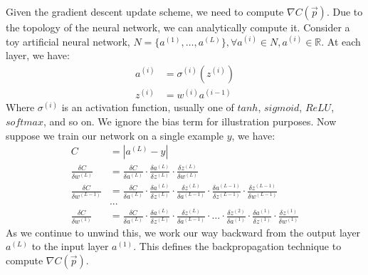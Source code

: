 \documentclass[paper=a4, fontsize=12pt]{scrartcl} %
\numberwithin{equation}{section} %
\numberwithin{figure}{section} %
\numberwithin{table}{section} %
\begin{document}
Given the gradient descent update scheme, we need to compute $\nabla C(\vec{p})$. Due to the topology of the neural network, we can analytically compute it. Consider a toy artificial neural network,
$N = \{a^{(1)}, \ldots, a^{(L)} \}, \forall a^{(i)} \in N, a^{(i)} \in \mathbb{R}$. At each layer, we have:
\begin{align*}
    a^{(i)} &= \sigma^{(i)} (z^{(i)}) \\
    z^{(i)} &= w^{(i)} a^{(i - 1)}
\end{align*}
Where $\sigma^{(i)}$ is an activation function, usually one of $tanh$, $sigmoid$, $ReLU$, $softmax$, and so on. We ignore the bias term for illustration purposes. Now suppose we train our network on a single example $y$, we have:
\begin{align*}
    C &= | a^{(L)} - y | \\
    \frac{\delta C}{\delta w^{(L)}} &= \frac{\delta C}{\delta a^{(L)}} \cdot \frac{\delta a^{(L)}}{\delta z^{(L)}} \cdot \frac{\delta z^{(L)}}{\delta w^{(L)}} \\
    \frac{\delta C}{\delta w^{(L - 1)}} &= \frac{\delta C}{\delta a^{(L)}} \cdot \frac{\delta a^{(L)}}{\delta z^{(L)}} \cdot \frac{\delta z^{(L)}}{\delta a^{(L - 1)}} \cdot \frac{\delta a^{(L - 1)}}{\delta z^{(L - 1)}} \cdot \frac{\delta z^{(L - 1)}}{\delta w^{(L - 1)}} \\
    &... \\
    \frac{\delta C}{\delta w^{(1)}} &= \frac{\delta C}{\delta a^{(L)}} \cdot \frac{\delta a^{(L)}}{\delta z^{(L)}} \cdot \frac{\delta z^{(L)}}{\delta a^{(L - 1)}} \cdot \ldots \cdot \frac{\delta z^{(2)}}{\delta a^{(1)}} \cdot \frac{\delta a^{(1)}}{\delta z^{(1)}} \cdot \frac{\delta z^{(1)}}{\delta w^{(1)}}
\end{align*}
As we continue to unwind this, we work our way backward from the output layer $a^{(L)}$ to the input layer $a^{(1)}$. This defines the backpropagation technique to compute $\nabla C(\vec{p})$.
\end{document}
